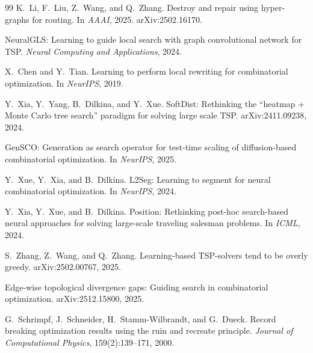 \documentclass[11pt,a4paper]{article}
\begin{document}
\begin{thebibliography}{99}
K.~Li, F.~Liu, Z.~Wang, and Q.~Zhang.
\newblock Destroy and repair using hyper-graphs for routing.
\newblock In \emph{AAAI}, 2025. arXiv:2502.16170.

NeuralGLS: Learning to guide local search with graph convolutional network for TSP.
\newblock \emph{Neural Computing and Applications}, 2024.

X.~Chen and Y.~Tian.
\newblock Learning to perform local rewriting for combinatorial optimization.
\newblock In \emph{NeurIPS}, 2019.

Y.~Xia, Y.~Yang, B.~Dilkina, and Y.~Xue.
\newblock SoftDist: Rethinking the ``heatmap + Monte Carlo tree search'' paradigm for solving large scale TSP.
\newblock arXiv:2411.09238, 2024.

GenSCO: Generation as search operator for test-time scaling of diffusion-based combinatorial optimization.
\newblock In \emph{NeurIPS}, 2025.

Y.~Xue, Y.~Xia, and B.~Dilkina.
\newblock L2Seg: Learning to segment for neural combinatorial optimization.
\newblock In \emph{NeurIPS}, 2024.

Y.~Xia, Y.~Xue, and B.~Dilkina.
\newblock Position: Rethinking post-hoc search-based neural approaches for solving large-scale traveling salesman problems.
\newblock In \emph{ICML}, 2024.

S.~Zhang, Z.~Wang, and Q.~Zhang.
\newblock Learning-based TSP-solvers tend to be overly greedy.
\newblock arXiv:2502.00767, 2025.

Edge-wise topological divergence gaps: Guiding search in combinatorial optimization.
\newblock arXiv:2512.15800, 2025.

G.~Schrimpf, J.~Schneider, H.~Stamm-Wilbrandt, and G.~Dueck.
\newblock Record breaking optimization results using the ruin and recreate principle.
\newblock \emph{Journal of Computational Physics}, 159(2):139--171, 2000.

\end{thebibliography}
\end{document}
